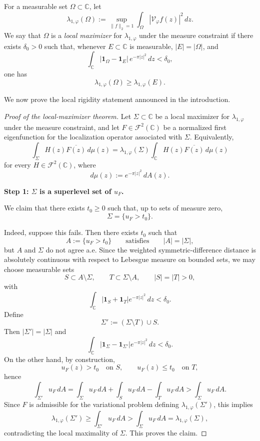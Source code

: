 \documentclass[a4paper,11pt,reqno]{amsart}
\numberwithin{equation}{section}
\theoremstyle{plain} %
\theoremstyle{definition} %
\theoremstyle{remark}
\newcommand{\C}{\mathbb{C}}
\begin{document}
For a measurable set \(\Omega\subset \C\), let
\[
\lambda_{1,\varphi}(\Omega)
:=
\sup_{\|f\|_2=1}\int_\Omega |\mathcal V_\varphi f(z)|^2\,dz.
\]
We say that \(\Omega\) is a \emph{local maximizer} for \(\lambda_{1,\varphi}\) under the
measure constraint if there exists \(\delta_0>0\) such that, whenever
\(E\subset \C\) is measurable, \(|E|=|\Omega|\), and
\[
\int_\C |\mathbf 1_\Omega-\mathbf 1_E|\,e^{-\pi |z|^2}\,dz<\delta_0,
\]
one has
\[
\lambda_{1,\varphi}(\Omega)\ge \lambda_{1,\varphi}(E).
\]

We now prove the local rigidity statement announced in the introduction.

\begin{proof}[Proof of the local-maximizer theorem]
Let \(\Sigma\subset \C\) be a local maximizer for \(\lambda_{1,\varphi}\) under the
measure constraint, and let \(F\in \mathcal F^2(\C)\) be a normalized first
eigenfunction for the localization operator associated with \(\Sigma\).
Equivalently,
\[
\int_\Sigma H(z)\overline{F(z)}\,d\mu(z)
=
\lambda_{1,\varphi}(\Sigma)\int_\C H(z)\overline{F(z)}\,d\mu(z)
\]
for every \(H\in \mathcal F^2(\C)\), where
\[
d\mu(z):=e^{-\pi |z|^2}\,dA(z).
\]

\medskip
\noindent
{\bf Step 1: \(\Sigma\) is a superlevel set of \(u_F\).}

We claim that there exists \(t_0\ge 0\) such that, up to sets of measure zero,
\[
\Sigma=\{u_F>t_0\}.
\]

Indeed, suppose this fails. Then there exists \(t_0\) such that
\[
A:=\{u_F>t_0\}
\qquad\text{satisfies}\qquad
|A|=|\Sigma|,
\]
but \(A\) and \(\Sigma\) do not agree a.e. Since the weighted symmetric-difference
distance is absolutely continuous with respect to Lebesgue measure on bounded
sets, we may choose measurable sets
\[
S\subset A\setminus \Sigma,
\qquad
T\subset \Sigma\setminus A,
\qquad
|S|=|T|>0,
\]
with
\[
\int_\C |\mathbf 1_S+\mathbf 1_T|e^{-\pi |z|^2}\,dz<\delta_0.
\]
Define
\[
\Sigma':=(\Sigma\setminus T)\cup S.
\]
Then \(|\Sigma'|=|\Sigma|\) and
\[
\int_\C |\mathbf 1_\Sigma-\mathbf 1_{\Sigma'}|e^{-\pi |z|^2}\,dz<\delta_0.
\]
On the other hand, by construction,
\[
u_F(z)>t_0 \quad \text{on } S,
\qquad
u_F(z)\le t_0 \quad \text{on } T,
\]
hence
\[
\int_{\Sigma'} u_F\,dA
=
\int_\Sigma u_F\,dA + \int_S u_F\,dA-\int_T u_F\,dA
>
\int_\Sigma u_F\,dA.
\]
Since \(F\) is admissible for the variational problem defining
\(\lambda_{1,\varphi}(\Sigma')\), this implies
\[
\lambda_{1,\varphi}(\Sigma')
\ge \int_{\Sigma'} u_F\,dA
>
\int_\Sigma u_F\,dA
=
\lambda_{1,\varphi}(\Sigma),
\]
contradicting the local maximality of \(\Sigma\). This proves the claim.


\end{proof}
\end{document}
